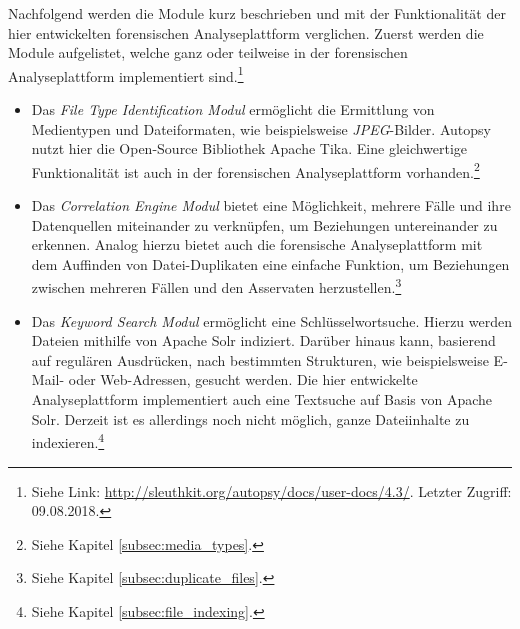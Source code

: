 \noindent
Nachfolgend werden die Module kurz beschrieben und mit der Funktionalität der hier entwickelten forensischen Analyseplattform verglichen. Zuerst werden die Module aufgelistet, welche ganz oder teilweise in der forensischen Analyseplattform implementiert sind.\footnote{Siehe Link: \url{http://sleuthkit.org/autopsy/docs/user-docs/4.3/}. Letzter Zugriff: 09.08.2018.}

\begin{itemize}
\item Das \textit{File Type Identification Modul} ermöglicht die Ermittlung von Medientypen und Dateiformaten, wie beispielsweise \textit{JPEG}-Bilder. Autopsy nutzt hier die Open-Source Bibliothek Apache Tika\texttrademark. Eine gleichwertige Funktionalität ist auch in der forensischen Analyseplattform vorhanden.\footnote{Siehe Kapitel \ref{subsec:media_types}.}
\item Das \textit{Correlation Engine Modul} bietet eine Möglichkeit, mehrere Fälle und ihre Datenquellen miteinander zu verknüpfen, um Beziehungen untereinander zu erkennen. Analog hierzu bietet auch die forensische Analyseplattform mit dem Auffinden von Datei-Duplikaten eine einfache Funktion, um Beziehungen zwischen mehreren Fällen und den Asservaten herzustellen.\footnote{Siehe Kapitel \ref{subsec:duplicate_files}.}
\item Das \textit{Keyword Search Modul} ermöglicht eine Schlüsselwortsuche. Hierzu werden Dateien mithilfe von Apache Solr indiziert. Darüber hinaus kann, basierend auf regulären Ausdrücken, nach bestimmten Strukturen, wie beispielsweise E-Mail- oder Web-Adressen, gesucht werden. Die hier entwickelte Analyseplattform implementiert auch eine Textsuche auf Basis von Apache Solr. Derzeit ist es allerdings noch nicht möglich, ganze Dateiinhalte zu indexieren.\footnote{Siehe Kapitel \ref{subsec:file_indexing}.}
\end{itemize}

